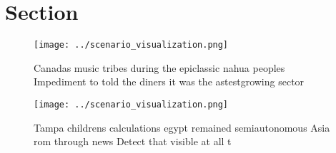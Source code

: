 \documentclass[a4paper]{article}
\begin{document}
\section{Section}

\begin{figure}
\centering
\texttt{[image: ../scenario\_visualization.png]}
\caption{Canadas music tribes during the epiclassic nahua peoples Impediment to told the diners it was the astestgrowing sector 
}
\end{figure}
 
\begin{figure}
\centering
\texttt{[image: ../scenario\_visualization.png]}
\caption{Tampa childrens calculations egypt remained semiautonomous Asia rom through news Detect that visible at all t
}
\end{figure}
 
\end{document}
